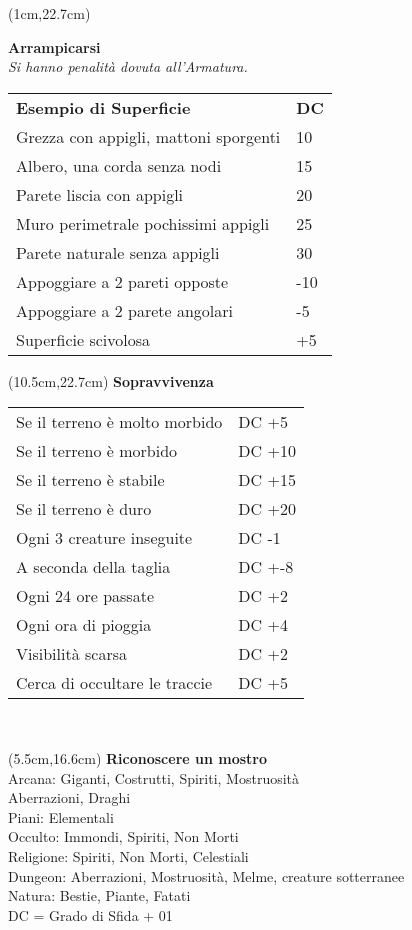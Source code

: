 \documentclass[a4paper,12 pt,openany]{book}
\begin{document}
\begin{textblock*}{9cm}(1cm,22.7cm) %

\textbf{Arrampicarsi}\\
\textit{Si hanno penalità dovuta all'Armatura.}

\begin{tabular}{ll}
	\textbf{Esempio di Superficie} & \textbf{DC}\\
	Grezza con appigli, mattoni sporgenti&10\\
	Albero, una corda senza nodi&15\\
	Parete liscia con appigli &20\\
	Muro perimetrale pochissimi appigli&25\\
	Parete naturale senza appigli&30\\
	Appoggiare a 2 pareti opposte&-10\\
	Appoggiare a 2 parete angolari&-5\\
	Superficie scivolosa&+5\\
\end{tabular}

\end{textblock*}	


	\begin{textblock*}{8cm}(10.5cm,22.7cm) %
\textbf{Sopravvivenza}
\begin{tabular}{ll}
	Se il terreno è molto morbido& DC +5\\
	Se il terreno è morbido& DC +10\\
	Se il terreno è stabile& DC +15\\
	Se il terreno è duro& DC +20\\
	Ogni 3 creature inseguite& DC -1\\
	A seconda della taglia& DC +-8\\
	Ogni 24 ore passate&DC +2\\
	Ogni ora di pioggia&DC +4\\
	Visibilità scarsa&DC +2\\
	Cerca di occultare le traccie&DC +5\\
\end{tabular}\\
\end{textblock*}


\begin{textblock*}{7cm}(5.5cm,16.6cm) %
	\textbf{Riconoscere un mostro}\\
	Arcana: Giganti, Costrutti, Spiriti, Mostruosità\\
	Aberrazioni, Draghi\\
	Piani: Elementali\\
	Occulto: Immondi, Spiriti, Non Morti\\
	Religione: Spiriti, Non Morti, Celestiali\\
	Dungeon: Aberrazioni, Mostruosità, Melme, creature sotterranee\\
	Natura: Bestie, Piante, Fatati\\
	DC = Grado di Sfida + 01
\end{textblock*}	
\end{document}
